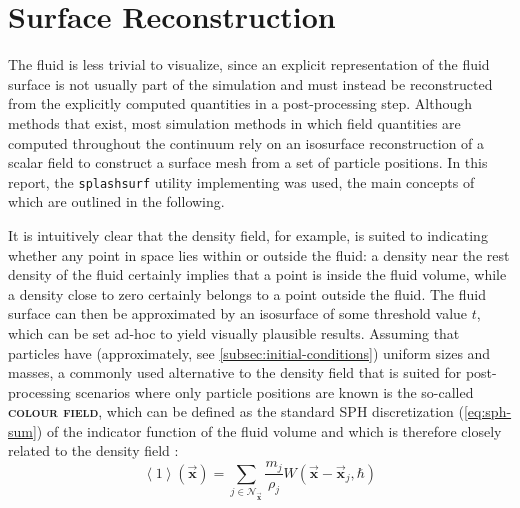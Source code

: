 \documentclass[oneside, a4paper]{book}
\newcommand\emphasis[1]{{\scshape\bfseries#1}}
\newcommand\angled[1]{\left\langle#1\right\rangle}
\newcommand\vek[1]{\vec{\bm{#1}}}
\newcommand\br[1]{\left(#1\right)}
\begin{document}
  \section{Surface Reconstruction}
  The fluid is less trivial to visualize, since an explicit representation of the fluid surface is not usually part of the simulation and must instead be reconstructed from the explicitly computed quantities in a post-processing step. Although methods that \autocite[explicitly operate on a surface representation]{surface-only-fluids} exist, most simulation methods in which field quantities are computed throughout the continuum rely on an isosurface reconstruction of a scalar field to construct a surface mesh from a set of particle positions. In this report, the \texttt{splashsurf} utility implementing \autocite[Weighted Laplacian Smoothing for Surface Recontruction]{laplacian-surf-reconst} was used, the main concepts of which are outlined in the following.
  
  It is intuitively clear that the density field, for example, is suited to indicating whether any point in space lies within or outside the fluid: a density near the rest density of the fluid certainly implies that a point is inside the fluid volume, while a density close to zero certainly belongs to a point outside the fluid. The fluid surface can then be approximated by an isosurface of some threshold value $t$, which can be set ad-hoc to yield visually plausible results. Assuming that particles have (approximately, see \autoref{subsec:initial-conditions}) uniform sizes and masses, a commonly used alternative to the density field that is suited for post-processing scenarios where only particle positions are known is the so-called \emphasis{colour field}, which can be defined as the standard SPH discretization (\autoref{eq:sph-sum}) of the indicator function of the fluid volume and which is therefore closely related to the density field \autocite{laplacian-surf-reconst}:
  \begin{equation}\label{eq:colour-field-def}
    \angled{1}\br{\vek{x}} = \sum_{j\in\mathcal{N}_{\vek{x}}} \frac{m_j}{\rho_j} W(\vek{x}-\vek{x}_j, \hbar)
  \end{equation}
  
\end{document}
